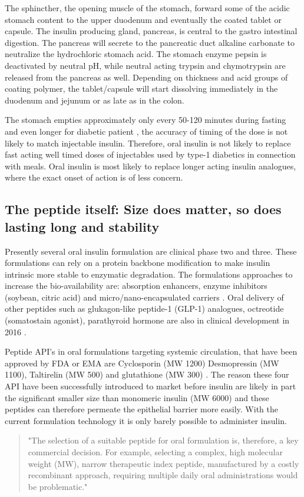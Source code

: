 The sphincther, the opening muscle of the stomach, forward some of the acidic stomach content to the upper duodenum and eventually the coated tablet or capsule. The insulin producing gland, pancreas, is central to the gastro intestinal digestion. The pancreas will secrete to the pancreatic duct alkaline carbonate to neutralize the hydrochloric stomach acid. The stomach enzyme pepsin is deactivated by neutral pH, while neutral acting trypsin and chymotrypsin are released from the pancreas as well. Depending on thickness and acid groups of coating polymer, the tablet/capsule will start dissolving immediately in the duodenum and jejunum or as late as in the colon.

The stomach empties approximately only every 50-120 minutes during fasting and even longer for diabetic patient \cite{silverthorn2010human,corvilain1995effect,gabor2010improving}, the accuracy of timing of the dose is not likely to match injectable insulin. Therefore, oral insulin is not likely to replace fast acting well timed doses of injectables used by type-1 diabetics in connection with meals. Oral insulin is most likely to replace longer acting insulin analogues, where the exact onset of action is of less concern.

\subsection{The peptide itself: Size does matter, so does lasting long and stability}
Presently several oral insulin formulation are clinical phase two and three. These formulations can rely on a protein backbone modification to make insulin intrinsic more stable to enzymatic degradation. The formulations approaches to increase the bio-availability are: absorption enhancers, enzyme inhibitors (soybean, citric acid) and micro/nano-encapsulated carriers \cite{aguirre2016current}. Oral delivery of other peptides such as glukagon-like peptide-1 (GLP-1) analogues, octreotide (somatostain agonist), parathyroid hormone are also in clinical development in 2016 \cite{aguirre2016current}.

Peptide API's in oral formulations targeting systemic circulation, that have been approved by FDA or EMA are Cyclosporin (MW 1200) Desmopressin (MW 1100), Taltirelin (MW 500) and glutathione (MW 300) \cite{aguirre2016current}. The reason these four API have been successfully introduced to market before insulin are likely in part the significant smaller size than monomeric insulin (MW 6000) and these peptides can therefore permeate the epithelial barrier more easily. With the current formulation technology it is only barely possible to administer insulin.
\begin{quote}
"The selection of a suitable peptide for oral formulation is, therefore, a key commercial decision. For example, selecting a complex, high molecular weight (MW), narrow therapeutic index peptide, manufactured by a costly recombinant approach, requiring multiple daily oral administrations would be problematic."
\cite{maher2014formulation}
\end{quote}

